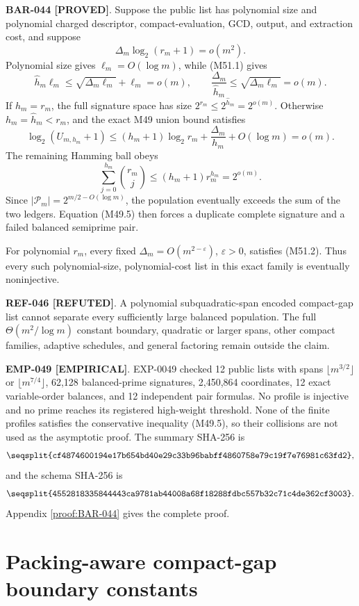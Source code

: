 \documentclass[11pt]{article}
\newcommand{\claimstatus}[2]{\textbf{#1 [#2]}}
\begin{document}
\claimstatus{BAR-044}{PROVED}. Suppose the public list has polynomial size
and polynomial charged descriptor, compact-evaluation, GCD, output, and
extraction cost, and suppose
\[
\Delta_m\log_2(r_m+1)=o(m^2).
\tag{M51.2}
\]
Polynomial size gives \(\ell_m=O(\log m)\), while (M51.1) gives
\[
\widehat h_m\ell_m
\le\sqrt{\Delta_m\ell_m}+\ell_m=o(m),
\qquad
\frac{\Delta_m}{\widehat h_m}
\le\sqrt{\Delta_m\ell_m}=o(m).
\tag{M51.3}
\]
If \(h_m=r_m\), the full signature space has size
\(2^{r_m}\le2^{\widehat h_m}=2^{o(m)}\). Otherwise
\(h_m=\widehat h_m<r_m\), and the exact M49 union bound satisfies
\[
\log_2(U_{m,h_m}+1)
\le
(h_m+1)\log_2 r_m+\frac{\Delta_m}{h_m}+O(\log m)
=o(m).
\tag{M51.4}
\]
The remaining Hamming ball obeys
\[
\sum_{j=0}^{h_m}\binom{r_m}{j}
\le(h_m+1)r_m^{h_m}=2^{o(m)}.
\tag{M51.5}
\]
Since
\(|\mathcal P_m|=2^{m/2-O(\log m)}\), the population eventually exceeds
the sum of the two ledgers. Equation (M49.5) then forces a duplicate complete
signature and a failed balanced semiprime pair.

For polynomial \(r_m\), every fixed
\(\Delta_m=O(m^{2-\varepsilon})\), \(\varepsilon>0\), satisfies (M51.2).
Thus every such polynomial-size, polynomial-cost list in this exact family
is eventually noninjective.

\claimstatus{REF-046}{REFUTED}. A polynomial subquadratic-span encoded
compact-gap list cannot separate every sufficiently large balanced
population. The full \(\Theta(m^2/\log m)\) constant boundary, quadratic or
larger spans, other compact families, adaptive schedules, and general
factoring remain outside the claim.

\claimstatus{EMP-049}{EMPIRICAL}. EXP-0049 checked 12 public lists with
spans \(\lfloor m^{3/2}\rfloor\) or \(\lfloor m^{7/4}\rfloor\),
62,128 balanced-prime signatures, 2,450,864 coordinates, 12 exact
variable-order balances, and 12 independent pair formulas. No profile is
injective and no prime reaches its registered high-weight threshold. None
of the finite profiles satisfies the conservative inequality (M49.5), so
their collisions are not used as the asymptotic proof. The summary SHA-256
is
\[
\texttt{\seqsplit{cf4874600194e17b654bd40e29c33b96babff4860758e79c19f7e76981c63fd2}},
\]
and the schema SHA-256 is
\[
\texttt{\seqsplit{4552818335844443ca9781ab44008a68f18288fdbc557b32c71c4de362cf3003}}.
\]
Appendix \ref{proof:BAR-044} gives the complete proof.

\section{Packing-aware compact-gap boundary constants}
\end{document}
